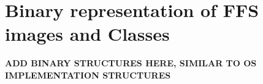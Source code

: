 \renewcommand{\chaptermark}[1]{\markboth{Appendix \thechapter\relax:\thinspace\relax#1}{}}
\chapter{Binary representation of FFS images and Classes}
\label{app:binary_rep}

\textbf{ADD BINARY STRUCTURES HERE, SIMILAR TO OS IMPLEMENTATION STRUCTURES}
